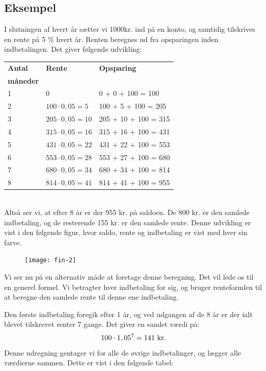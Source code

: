 \documentclass[12pt,oneside,a4paper]{article}
\begin{document}
\begin{tcolorbox}
\subsection*{Eksempel}
I slutningen af hvert år sætter vi 1000kr. ind på en konto, og samtidig
tilskrives en rente på 5 $\%$ hvert år. Renten beregnes ud fra
opsparingen inden indbetalingen.  Det giver følgende udvikling:
\\

\begin{tabular}{|l|l|l|}
    \hline
    \textbf{Antal} & \textbf{Rente} & \textbf{Opsparing} \\
    \textbf{måneder} &  & \\
    \hline
    1 & 0 & 0 + 0 + 100 = 100 \\
    \hline
    2 & $100\cdot 0,05 = 5$ & 100 + 5 + 100 = 205 \\
    \hline
    3 & $205\cdot 0,05 = 10$ & 205 + 10 + 100 = 315 \\
    \hline
    4 & $315\cdot 0,05 = 16$ & 315 + 16 + 100 = 431 \\
    \hline
    5 & $431\cdot 0,05 = 22$ & 431 + 22 + 100 = 553 \\
    \hline
    6 & $553\cdot 0,05 = 28$ & 553 + 27 + 100 = 680 \\
    \hline
    7 & $680\cdot 0,05 = 34$ & 680 + 34 + 100 = 814 \\
    \hline
    8 & $814\cdot 0,05 = 41$ & 814 + 41 + 100 = 955 \\
    \hline
\end{tabular}
\\

Altså ser vi, at efter 8 år er der 955 kr. på saldoen. De 800 kr. er den
samlede indbetaling, og de resterende 155 kr. er den samlede rente.
Denne udvikling er vist i den følgende figur, hvor saldo, rente og indbetaling er vist med hver sin farve.
\begin{figure}[H]
    \centering
    \texttt{[image: fin-2]}
\end{figure}
\end{tcolorbox}

Vi ser nu på en alternativ måde at foretage denne beregning. Det vil lede os
til en generel formel. Vi betragter hver indbetaling for sig, og bruger
renteformlen til at beregne den samlede rente til denne ene indbetaling.

Den første indbetaling foregik efter 1 år, og ved udgangen af de 8 år
er der ialt blevet tilskrevet renter 7 gange.  Det giver en samlet værdi på:
\[
    100\cdot 1,05^7 = 141 {\,\,\rm kr.}
\]
Denne udregning gentager vi for alle de øvrige indbetalinger, og lægger alle
værdierne sammen.  Dette er vist i den følgende tabel:
\\
\end{document}
